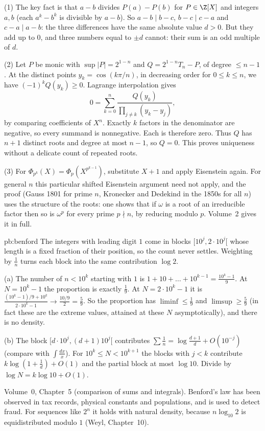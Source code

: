 (1) The key fact is that $a-b$ divides $P(a)-P(b)$ for $P\in\Z[X]$ and integers $a,b$ (each $a^k-b^k$ is divisible by $a-b$). So $a-b\mid b-c$, $b-c\mid c-a$ and $c-a\mid a-b$: the three differences have the same absolute value $d>0$. But they add up to $0$, and three numbers equal to $\pm d$ cannot: their sum is an odd multiple of $d$.

(2) Let $P$ be monic with $\sup|P|=2^{1-n}$ and $Q=2^{1-n}T_n-P$, of degree $\le n-1$. At the distinct points $y_k=\cos(k\pi/n)$, in decreasing order for $0\le k\le n$, we have $(-1)^kQ(y_k)\ge0$. Lagrange interpolation gives
\[
0=\sum_{k=0}^n\frac{Q(y_k)}{\prod_{j\ne k}(y_k-y_j)},
\]
by comparing coefficients of $X^n$. Exactly $k$ factors in the denominator are negative, so every summand is nonnegative. Each is therefore zero. Thus $Q$ has $n+1$ distinct roots and degree at most $n-1$, so $Q=0$. This proves uniqueness without a delicate count of repeated roots.

(3) For $\Phi_{p^k}(X)=\Phi_p(X^{p^{k-1}})$, substitute $X+1$ and apply Eisenstein again. For general $n$ this particular shifted Eisenstein argument need not apply, and the proof (Gauss 1801 for prime $n$, Kronecker and Dedekind in the 1850s for all $n$) uses the structure of the roots: one shows that if $\omega$ is a root of an irreducible factor then so is $\omega^p$ for every prime $p\nmid n$, by reducing modulo $p$. Volume~2 gives it in full.

\begin{solution}{pb:benford}
\idea The integers with leading digit $1$ come in blocks $[10^j,2\cdot10^j[$ whose length is a fixed fraction of their position,
so the count never settles. Weighting by $\frac1n$ turns each block into the same contribution $\log2$.

\writeup (a) The number of $n<10^k$ starting with $1$ is $1+10+\dots+10^{k-1}=\frac{10^k-1}9$. At $N=10^k-1$ the proportion is exactly
$\frac19$. At $N=2\cdot10^k-1$ it is $\frac{(10^k-1)/9+10^k}{2\cdot10^k-1}\to\frac{10/9}2=\frac59$. So the proportion has $\liminf\le\frac19$
and $\limsup\ge\frac59$ (in fact these are the extreme values, attained at these $N$ asymptotically), and there is no density.

(b) The block $[d\cdot10^j,(d+1)10^j[$ contributes $\sum\frac1n=\log\frac{d+1}d+O(10^{-j})$ (compare with $\int\frac{dx}x$). For
$10^k\le N<10^{k+1}$ the blocks with $j<k$ contribute $k\log(1+\frac1d)+O(1)$ and the partial block at most $\log10$. Divide by
$\log N=k\log10+O(1)$.

\tools Volume~0, Chapter~5 (comparison of sums and integrals).
\leads Benford's law has been observed in tax records, physical constants and populations, and is used to detect fraud. For sequences
like $2^n$ it holds with natural density, because $n\log_{10}2$ is equidistributed modulo $1$ (Weyl, Chapter~10).
\end{solution}

